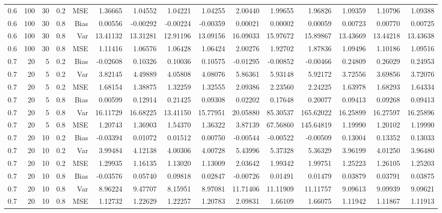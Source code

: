 \begin{table}[!htbp]
\begin{tabular}{lrrrrrrrrrrrrrr}
0.6 & 100 & 30 & 0.2 & MSE & 1.36665 & 1.04552 & 1.04221 & 1.04255 & 2.00440 & 1.99655 & 1.96826 & 1.09359 & 1.10796 & 1.09388 \\
0.6 & 100 & 30 & 0.8 & Bias & 0.00556 & -0.00292 & -0.00224 & -0.00359 & 0.00021 & 0.00002 & 0.00059 & 0.00723 & 0.00770 & 0.00725 \\
0.6 & 100 & 30 & 0.8 & Var & 13.41132 & 13.31281 & 12.91196 & 13.09156 & 16.09033 & 15.97672 & 15.89867 & 13.43669 & 13.44218 & 13.43638 \\
0.6 & 100 & 30 & 0.8 & MSE & 1.11416 & 1.06576 & 1.06428 & 1.06424 & 2.00276 & 1.92702 & 1.87836 & 1.09496 & 1.10186 & 1.09516 \\
0.7 &  20 &  5 & 0.2 & Bias & -0.02608 & 0.10326 & 0.10036 & 0.10575 & -0.01295 & -0.00852 & -0.00466 & 0.24809 & 0.26029 & 0.24953 \\
0.7 &  20 &  5 & 0.2 & Var & 3.82145 & 4.49889 & 4.05808 & 4.08076 & 5.86361 & 5.93148 & 5.92172 & 3.72556 & 3.69856 & 3.72076 \\
0.7 &  20 &  5 & 0.2 & MSE & 1.68154 & 1.38875 & 1.32259 & 1.32555 & 2.09386 & 2.23560 & 2.24225 & 1.63978 & 1.68293 & 1.64334 \\
0.7 &  20 &  5 & 0.8 & Bias & 0.00599 & 0.12914 & 0.21425 & 0.09308 & 0.02202 & 0.17648 & 0.20077 & 0.09413 & 0.09268 & 0.09413 \\
0.7 &  20 &  5 & 0.8 & Var & 16.11729 & 16.68225 & 13.41150 & 15.77951 & 20.05880 & 85.30537 & 165.62022 & 16.25899 & 16.27597 & 16.25896 \\
0.7 &  20 &  5 & 0.8 & MSE & 1.20743 & 1.36903 & 1.54370 & 1.36322 & 3.87139 & 67.56860 & 145.64819 & 1.19990 & 1.20102 & 1.19990 \\
0.7 &  20 & 10 & 0.2 & Bias & -0.03394 & 0.01072 & 0.01512 & 0.00750 & -0.00544 & -0.00522 & -0.00509 & 0.13004 & 0.13352 & 0.13033 \\
0.7 &  20 & 10 & 0.2 & Var & 3.99484 & 4.12138 & 4.00306 & 4.00728 & 5.43996 & 5.37328 & 5.36329 & 3.96199 & 4.01250 & 3.96480 \\
0.7 &  20 & 10 & 0.2 & MSE & 1.29935 & 1.16135 & 1.13020 & 1.13009 & 2.03642 & 1.99342 & 1.99751 & 1.25223 & 1.26105 & 1.25203 \\
0.7 &  20 & 10 & 0.8 & Bias & -0.03576 & 0.05740 & 0.09818 & 0.02847 & -0.00726 & 0.01491 & 0.01479 & 0.03879 & 0.03791 & 0.03875 \\
0.7 &  20 & 10 & 0.8 & Var & 8.96224 & 9.47707 & 8.15951 & 8.97081 & 11.71406 & 11.11909 & 11.11757 & 9.09613 & 9.09939 & 9.09621 \\
0.7 &  20 & 10 & 0.8 & MSE & 1.12732 & 1.22629 & 1.22257 & 1.20783 & 2.09831 & 1.66109 & 1.66075 & 1.11942 & 1.11867 & 1.11913 \\

\end{tabular}
\end{table}
